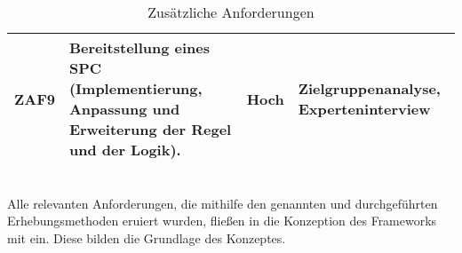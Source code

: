 \begin{table}[hbt!]
\begin{center}
\begin{tabular}{ | p{1.0cm} | p{9.2cm} | p{1.6cm} | p{3.1cm} | }
            \hline
                ZAF9 & Bereitstellung eines \ac{SPC} (Implementierung, Anpassung und Erweiterung der Regel und der Logik). & Hoch & Zielgruppenanalyse, Experteninterview \\ 
            \hline
        \end{tabular}
    \end{center}
    \caption{Zusätzliche Anforderungen}
    \label{tab:furtherRequirements}
\end{table} 
\\
Alle relevanten Anforderungen, die mithilfe den genannten und durchgeführten Erhebungsmethoden eruiert wurden, fließen in die Konzeption 
des Frameworks mit ein. Diese bilden die Grundlage des Konzeptes. 
